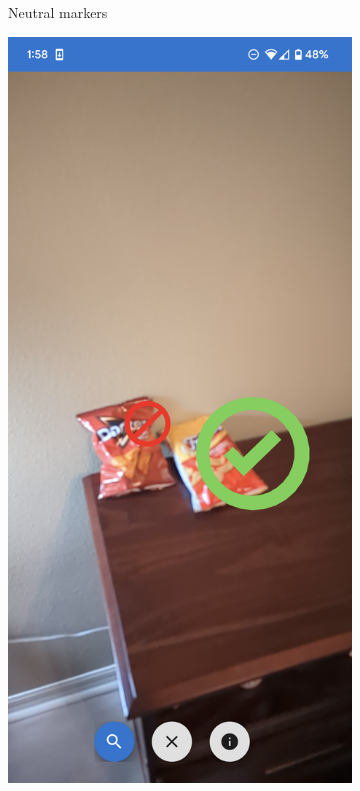 \documentclass[thesis]{fputhesis}
\begin{document}
\begin{body}
\begin{figure}[h!]
\begin{subfigure}[]{0.3\textwidth}
        \caption{Neutral markers}
        \label{fig:neutral-mark}
    \end{subfigure}
    \begin{subfigure}[]{0.3\textwidth}
        \includegraphics[width=\textwidth]{Images/red-and-green.png}

\end{subfigure}
\end{figure}
\end{body}
\end{document}
